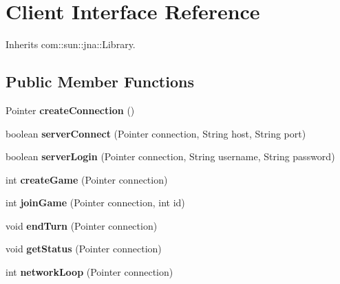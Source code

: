 \hypertarget{interfaceClient}{
\section{Client Interface Reference}
\label{interfaceClient}
}


Inherits com::sun::jna::Library.

\subsection*{Public Member Functions}
\begin{DoxyCompactItemize}
\item 
\hypertarget{interfaceClient_a6d25aca960b1e1a38ce203d6a969f9bc}{
Pointer {\bfseries createConnection} ()}
\label{interfaceClient_a6d25aca960b1e1a38ce203d6a969f9bc}

\item 
\hypertarget{interfaceClient_acfc9ada4dc1c3c147bd10d33a93cd5d5}{
boolean {\bfseries serverConnect} (Pointer connection, String host, String port)}
\label{interfaceClient_acfc9ada4dc1c3c147bd10d33a93cd5d5}

\item 
\hypertarget{interfaceClient_a889a9d7b3e68cb21ffcfaa7b2c19861b}{
boolean {\bfseries serverLogin} (Pointer connection, String username, String password)}
\label{interfaceClient_a889a9d7b3e68cb21ffcfaa7b2c19861b}

\item 
\hypertarget{interfaceClient_a4912adbddcbeff19d01f001ccd210375}{
int {\bfseries createGame} (Pointer connection)}
\label{interfaceClient_a4912adbddcbeff19d01f001ccd210375}

\item 
\hypertarget{interfaceClient_a8a9bed85e15f075bee07458a87645b6b}{
int {\bfseries joinGame} (Pointer connection, int id)}
\label{interfaceClient_a8a9bed85e15f075bee07458a87645b6b}

\item 
\hypertarget{interfaceClient_aff558de8ad20a23858ce3dc165fc4db7}{
void {\bfseries endTurn} (Pointer connection)}
\label{interfaceClient_aff558de8ad20a23858ce3dc165fc4db7}

\item 
\hypertarget{interfaceClient_a64de0e135006bec1aa4875ab0760f691}{
void {\bfseries getStatus} (Pointer connection)}
\label{interfaceClient_a64de0e135006bec1aa4875ab0760f691}

\item 
\hypertarget{interfaceClient_a88dd14b60667b07d577798e1c707c05f}{
int {\bfseries networkLoop} (Pointer connection)}
\label{interfaceClient_a88dd14b60667b07d577798e1c707c05f}


\end{DoxyCompactItemize}

